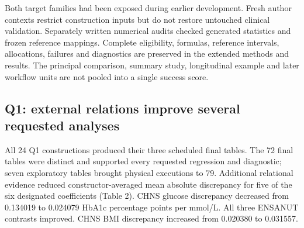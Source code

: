 \documentclass[10pt,twocolumn]{article}
\begin{document}
Both target families had been exposed during earlier development. Fresh author contexts restrict construction inputs but do not restore untouched clinical validation. Separately written numerical audits checked generated statistics and frozen reference mappings. Complete eligibility, formulas, reference intervals, allocations, failures and diagnostics are preserved in the extended methods and results. The principal comparison, summary study, longitudinal example and later workflow units are not pooled into a single success score.


\subsection{Q1: external relations improve several requested analyses}

All 24 Q1 constructions produced their three scheduled final tables. The 72 final tables were distinct and supported every requested regression and diagnostic; seven exploratory tables brought physical executions to 79. Additional relational evidence reduced constructor-averaged mean absolute discrepancy for five of the six designated coefficients (Table 2). CHNS glucose discrepancy decreased from 0.134019 to 0.024079 HbA1c percentage points per mmol/L. All three ENSANUT contrasts improved. CHNS BMI discrepancy increased from 0.020380 to 0.031557.
\end{document}
